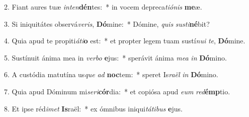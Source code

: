 2. Fiant aures tuæ \textit{in}\textit{ten}\textbf{dén}tes:~*  in vocem depreca\textit{ti}\textit{ó}\textit{nis} \textbf{me}æ.\

3. Si iniquitátes observá\textit{ve}\textit{ris}, \textbf{Dó}mine:~*  Dómine, \textit{quis} \textit{sus}\textit{ti}\textbf{né}bit?\

4. Quia apud te propiti\textit{á}\textit{ti}\textbf{o} est:~*  et propter legem tuam sustí\textit{nu}\textit{i} \textit{te}, \textbf{Dó}mine.\

5. Sustínuit ánima mea in \textit{ver}\textit{bo} \textbf{e}jus:~*  sperávit ánima \textit{me}\textit{a} \textit{in} \textbf{Dó}mino.\

6. A custódia matutína us\textit{que} \textit{ad} \textbf{noc}tem:~*  speret Is\textit{ra}\textit{ël} \textit{in} \textbf{Dó}mino.\

7. Quia apud Dóminum mi\textit{se}\textit{ri}\textbf{cór}dia:~*  et copiósa apud \textit{e}\textit{um} \textit{red}\textbf{émp}tio.\

8. Et ipse réd\textit{i}\textit{met} \textbf{Is}raël:~*  ex ómnibus iniqui\textit{tá}\textit{ti}\textit{bus} \textbf{e}jus.\

